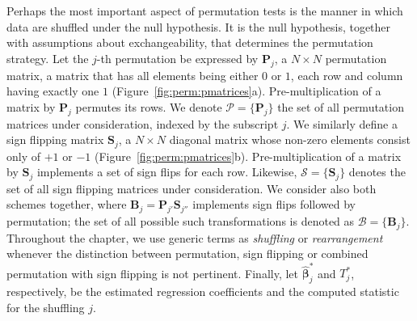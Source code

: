 Perhaps the most important aspect of permutation tests is the manner in which data are shuffled under the null hypothesis. It is the null hypothesis, together with assumptions about exchangeability, that determines the permutation strategy. Let the $j$-th permutation be expressed by $\mathbf{P}_{j}$, a $N \times N$ permutation matrix, a matrix that has all elements being either $0$ or $1$, each row and column having exactly one $1$ (Figure~\ref{fig:perm:pmatrices}a). Pre-multiplication of a matrix by $\mathbf{P}_{j}$ permutes its rows. We denote $\mathcal{P}=\{\mathbf{P}_{j}\}$ the set of all permutation matrices under consideration, indexed by the subscript $j$. We similarly define a sign flipping matrix $\mathbf{S}_{j}$, a $N \times N$ diagonal matrix whose non-zero elements consist only of $+1$ or $-1$ (Figure~\ref{fig:perm:pmatrices}b). Pre-multiplication of a matrix by $\mathbf{S}_{j}$ implements a set of sign flips for each row. Likewise, $\mathcal{S}=\{\mathbf{S}_{j}\}$ denotes the set of all sign flipping matrices under consideration. We consider also both schemes together, where $\mathbf{B}_{j}=\mathbf{P}_{j'}\mathbf{S}_{j''}$ implements sign flips followed by permutation; the set of all possible such transformations is denoted as $\mathcal{B}=\{\mathbf{B}_{j}\}$. Throughout the chapter, we use generic terms as \emph{shuffling} or \emph{rearrangement} whenever the distinction between permutation, sign flipping or combined permutation with sign flipping is not pertinent. Finally, let $\boldsymbol{\hat{\beta}}^{*}_{j}$ and $T^{*}_{j}$, respectively, be the estimated regression coefficients and the computed statistic for the shuffling $j$. 

